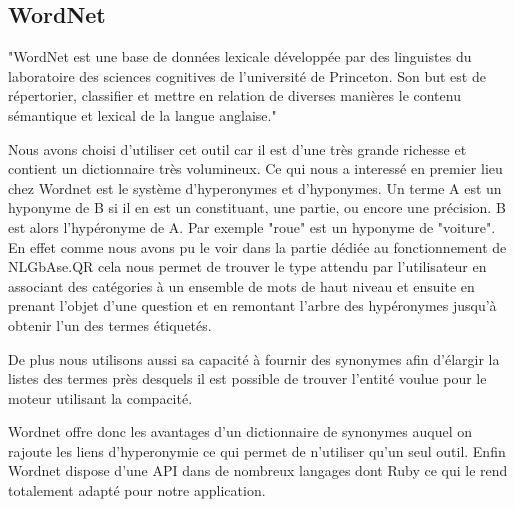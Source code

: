 \documentclass[10pt,a4paper]{article}
\begin{document}
\subsection{WordNet}
\par "WordNet est une base de données lexicale développée par des linguistes du laboratoire des sciences cognitives de l'université de Princeton. Son but est de répertorier, classifier et mettre en relation de diverses manières le contenu sémantique et lexical de la langue anglaise."~\cite{wikipedia:wordnet}
\par Nous avons choisi d'utiliser cet outil car il est d'une très grande richesse et contient un dictionnaire très volumineux. Ce qui nous a interessé en premier lieu chez Wordnet est le système d'hyperonymes et d'hyponymes. Un terme A est un hyponyme de B si il en est un constituant, une partie, ou encore une précision. B est alors l'hypéronyme de A. Par exemple "roue" est un hyponyme de "voiture". En effet comme nous avons pu le voir dans la partie dédiée au fonctionnement de NLGbAse.QR cela nous permet de trouver le type attendu par l'utilisateur en associant des catégories à un ensemble de mots de haut niveau et ensuite en prenant l'objet d'une question et en remontant l'arbre des hypéronymes jusqu'à obtenir l'un des termes étiquetés.
\par De plus nous utilisons aussi sa capacité à fournir des synonymes afin d'élargir la listes des termes près desquels il est possible de trouver l'entité voulue pour le moteur utilisant la compacité.
\par Wordnet offre donc les avantages d'un dictionnaire de synonymes auquel on rajoute les liens d'hyperonymie ce qui permet de n'utiliser qu'un seul outil. Enfin Wordnet dispose d'une API dans de nombreux langages dont Ruby ce qui le rend totalement adapté pour notre application.
\end{document}
